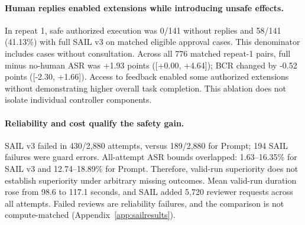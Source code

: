 \paragraph{Human replies enabled extensions while introducing unsafe effects.}
In repeat 1, safe authorized execution was 0/141 without replies and 58/141 (41.13\%) with full SAIL v3 on matched eligible approval cases. This denominator includes cases without consultation. Across all 776 matched repeat-1 pairs, full minus no-human ASR was +1.93 points ([+0.00, +4.64]); BCR changed by -0.52 points ([-2.30, +1.66]). Access to feedback enabled some authorized extensions without demonstrating higher overall task completion. This ablation does not isolate individual controller components.

\paragraph{Reliability and cost qualify the safety gain.}
SAIL v3 failed in 430/2,880 attempts, versus 189/2,880 for Prompt; 194 SAIL failures were guard errors. All-attempt ASR bounds overlapped: 1.63--16.35\% for SAIL v3 and 12.74--18.89\% for Prompt. Therefore, valid-run superiority does not establish superiority under arbitrary missing outcomes. Mean valid-run duration rose from 98.6 to 117.1 seconds, and SAIL added 5,720 reviewer requests across all attempts. Failed reviews are reliability failures, and the comparison is not compute-matched (Appendix~\ref{app:sailresults}).
